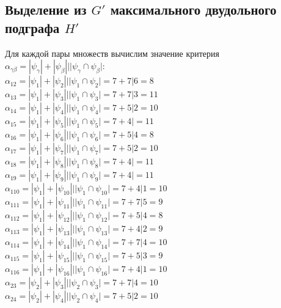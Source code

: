 \documentclass[12pt,a4paper]{report}
\begin{document}
\subsection*{Выделение из $G'$ максимального двудольного подграфа $H'$}
Для каждой пары множеств вычислим значение критерия \\
$\alpha_{\gamma\beta} = |\psi_\gamma| + |\psi_\beta| | |\psi_\gamma \cap \psi_\beta|$:\\
\hfill\break
$\alpha_{12} = |\psi_{1}| + |\psi_{2}| | |\psi_{1} \cap \psi_{2}| = 7 + 7 | 6 = 8$ \\
$\alpha_{13} = |\psi_{1}| + |\psi_{3}| | |\psi_{1} \cap \psi_{3}| = 7 + 7 | 3 = 11$ \\
$\alpha_{14} = |\psi_{1}| + |\psi_{4}| | |\psi_{1} \cap \psi_{4}| = 7 + 5 | 2 = 10$ \\
$\alpha_{15} = |\psi_{1}| + |\psi_{5}| | |\psi_{1} \cap \psi_{5}| = 7 + 4 |   = 11$ \\
$\alpha_{16} = |\psi_{1}| + |\psi_{6}| | |\psi_{1} \cap \psi_{6}| = 7 + 5 | 4 = 8$ \\
$\alpha_{17} = |\psi_{1}| + |\psi_{7}| | |\psi_{1} \cap \psi_{7}| = 7 + 5 | 2 = 10$ \\
$\alpha_{18} = |\psi_{1}| + |\psi_{8}| | |\psi_{1} \cap \psi_{8}| = 7 + 4 |   = 11$ \\
$\alpha_{19} = |\psi_{1}| + |\psi_{9}| | |\psi_{1} \cap \psi_{9}| = 7 + 4 |   = 11$ \\
$\alpha_{110} = |\psi_{1}| + |\psi_{10}| | |\psi_{1} \cap \psi_{10}| = 7 + 4 | 1 = 10$ \\
$\alpha_{111} = |\psi_{1}| + |\psi_{11}| | |\psi_{1} \cap \psi_{11}| = 7 + 7 | 5 = 9$ \\
$\alpha_{112} = |\psi_{1}| + |\psi_{12}| | |\psi_{1} \cap \psi_{12}| = 7 + 5 | 4 = 8$ \\
$\alpha_{113} = |\psi_{1}| + |\psi_{13}| | |\psi_{1} \cap \psi_{13}| = 7 + 4 | 2 = 9$ \\
$\alpha_{114} = |\psi_{1}| + |\psi_{14}| | |\psi_{1} \cap \psi_{14}| = 7 + 7 | 4 = 10$ \\
$\alpha_{115} = |\psi_{1}| + |\psi_{15}| | |\psi_{1} \cap \psi_{15}| = 7 + 5 | 3 = 9$ \\
$\alpha_{116} = |\psi_{1}| + |\psi_{16}| | |\psi_{1} \cap \psi_{16}| = 7 + 4 | 1 = 10$ \\
$\alpha_{23} = |\psi_{2}| + |\psi_{3}| | |\psi_{2} \cap \psi_{3}| = 7 + 7 | 4 = 10$ \\
$\alpha_{24} = |\psi_{2}| + |\psi_{4}| | |\psi_{2} \cap \psi_{4}| = 7 + 5 | 2 = 10$ \\
\end{document}

